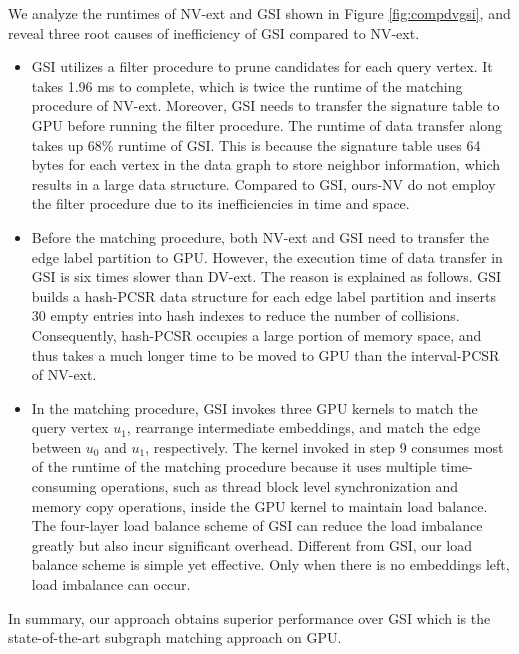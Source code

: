 We analyze the runtimes of NV-ext and GSI shown in Figure \ref{fig:compdvgsi}, and reveal three root causes of inefficiency of GSI compared to NV-ext.
\begin{itemize}
  \item GSI utilizes a filter procedure to prune candidates for each query vertex. It takes 1.96 ms to complete, which is twice the runtime of the matching procedure of NV-ext. Moreover, GSI needs to transfer the signature table to GPU before running the filter procedure. The runtime of data transfer along takes up 68\% runtime of GSI. This is because the signature table uses 64 bytes for each vertex in the data graph to store neighbor information, which results in a large data structure. Compared to GSI, ours-NV do not employ the filter procedure due to its inefficiencies in time and space.
  \item Before the matching procedure, both NV-ext and GSI need to transfer the edge label partition to GPU. However, the execution time of data transfer in GSI is six times slower than DV-ext. The reason is explained as follows. GSI builds a hash-PCSR data structure for each edge label partition and inserts 30 empty entries into hash indexes to reduce the number of collisions. Consequently, hash-PCSR occupies a large portion of memory space, and thus takes a much longer time to be moved to GPU than the interval-PCSR of NV-ext.
  \item In the matching procedure, GSI invokes three GPU kernels to match the query vertex $u_1$, rearrange intermediate embeddings, and match the edge between $u_0$ and $u_1$, respectively. The kernel invoked in step 9 consumes most of the runtime of the matching procedure because it uses multiple time-consuming operations, such as thread block level synchronization and memory copy operations, inside the GPU kernel to maintain load balance. The four-layer load balance scheme of GSI can reduce the load imbalance greatly but also incur significant overhead. Different from GSI, our load balance scheme is simple yet effective. Only when there is no embeddings left, load imbalance can occur.
\end{itemize}

In summary, our approach obtains superior performance over GSI which is the state-of-the-art subgraph matching approach on GPU.

